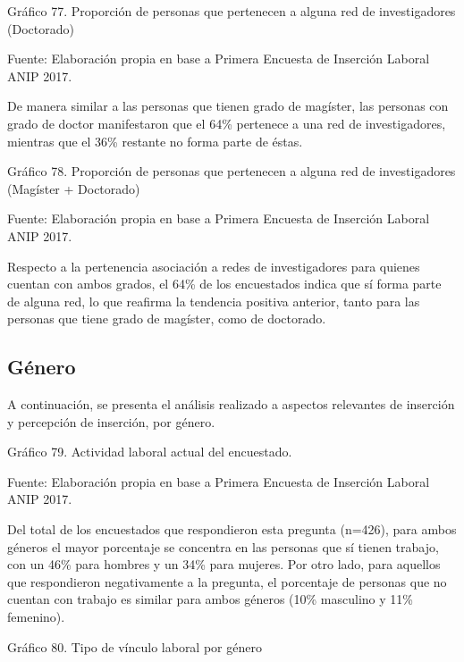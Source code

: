 \documentclass{article}
\begin{document}
Gráfico 77. Proporción de personas que pertenecen a alguna red de investigadores (Doctorado)


Fuente: Elaboración propia en base a Primera Encuesta de Inserción Laboral ANIP 2017.

De manera similar a las personas que tienen grado de magíster, las personas con grado de doctor manifestaron que el 64\% pertenece a una red de investigadores, mientras que el 36\% restante no forma parte de éstas.

Gráfico 78. Proporción de personas que pertenecen a alguna red de investigadores (Magíster + Doctorado)


Fuente: Elaboración propia en base a Primera Encuesta de Inserción Laboral ANIP 2017.

Respecto a la pertenencia asociación a redes de investigadores para quienes cuentan con ambos grados, el 64\% de los encuestados indica que sí forma parte de alguna red, lo que reafirma la tendencia positiva anterior, tanto para las personas que tiene grado de magíster, como de doctorado.

\subsection{Género} 

A continuación, se presenta el análisis realizado a aspectos relevantes de inserción y percepción de inserción, por género.

Gráfico 79. Actividad laboral actual del encuestado.


Fuente: Elaboración propia en base a Primera Encuesta de Inserción Laboral ANIP 2017.

Del total de los encuestados que respondieron esta pregunta (n=426), para ambos géneros el mayor porcentaje se concentra en las personas que sí tienen trabajo, con un 46\% para hombres y un 34\% para mujeres. Por otro lado, para aquellos que respondieron negativamente a la pregunta, el porcentaje de personas que no cuentan con trabajo es similar para ambos géneros (10\% masculino y 11\% femenino).

Gráfico 80. Tipo de vínculo laboral por género

\end{document}

